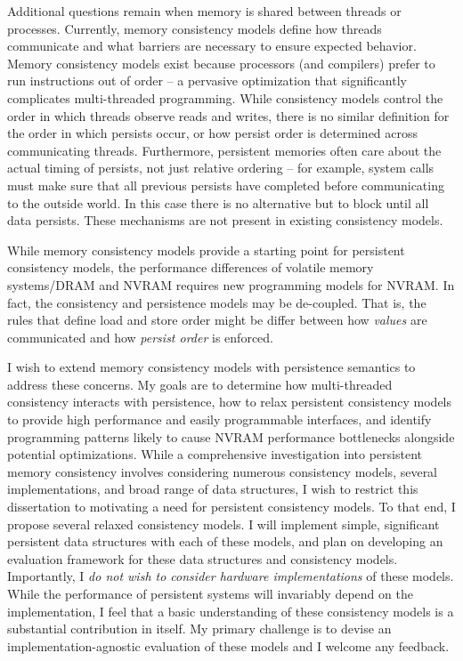 Additional questions remain when memory is shared between threads or processes.
Currently, memory consistency models define how threads communicate and what barriers are necessary to ensure expected behavior.
Memory consistency models exist because processors (and compilers) prefer to run instructions out of order -- a pervasive optimization that significantly complicates multi-threaded programming.
While consistency models control the order in which threads observe reads and writes, there is no similar definition for the order in which persists occur, or how persist order is determined across communicating threads.
Furthermore, persistent memories often care about the actual timing of persists, not just relative ordering -- for example, system calls must make sure that all previous persists have completed before communicating to the outside world.
In this case there is no alternative but to block until all data persists.
These mechanisms are not present in existing consistency models.

While memory consistency models provide a starting point for persistent consistency models, the performance differences of volatile memory systems/DRAM and NVRAM requires new programming models for NVRAM.
In fact, the consistency and persistence models may be de-coupled.
That is, the rules that define load and store order might be differ between how \emph{values} are communicated and how \emph{persist order} is enforced.

I wish to extend memory consistency models with persistence semantics to address these concerns.
My goals are to determine how multi-threaded consistency interacts with persistence, how to relax persistent consistency models to provide high performance and easily programmable interfaces, and identify programming patterns likely to cause NVRAM performance bottlenecks alongside potential optimizations.
While a comprehensive investigation into persistent memory consistency involves considering numerous consistency models, several implementations, and broad range of data structures, I wish to restrict this dissertation to motivating a need for persistent consistency models.
To that end, I propose several relaxed consistency models.
I will implement simple, significant persistent data structures with each of these models, and plan on developing an evaluation framework for these data structures and consistency models.
Importantly, I \emph{do not wish to consider hardware implementations} of these models.
While the performance of persistent systems will invariably depend on the implementation, I feel that a basic understanding of these consistency models is a substantial contribution in itself.
My primary challenge is to devise an implementation-agnostic evaluation of these models and I welcome any feedback.

